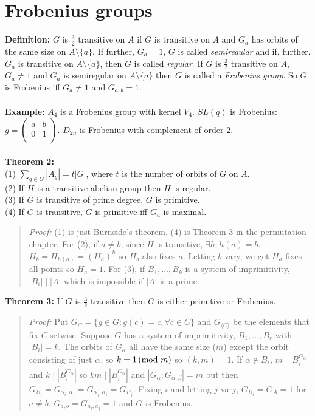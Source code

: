 \section {Frobenius groups}
{\bf Definition:}  
$G$ is ${\frac 3 2}$ transitive on $A$ if $G$ is transitive on $A$ and $G_a$ has orbits of
the same size on $A \setminus \{a\}$. 
If further, $G_a = 1$, $G$ is called \emph{semiregular} and if, further, $G_a$ is transitive on $A \setminus \{a\}$,
then $G$ is called \emph{regular}.  If $G$ is ${\frac 3 2}$ transitive on $A$, $G_a \ne 1$ and $G_a$ is
semiregular on $A \setminus \{a\}$ then $G$ is called a \emph{Frobenius group}.  So $G$ is Frobenius iff
$G_a \ne 1$ and $G_{a,b} = 1$.
\\
\\
{\bf Example:} $A_4$ is a Frobenius group with kernel $V_4$. $SL(q)$ is Frobenius:
$g = 
\left(
\begin{array}{cc}
a &  b \\
0 &  1 \\
\end{array}
\right)$.
$D_{2n}$ is Frobenius with complement of order $2$.
\\
\\
{\bf Theorem 2:} \\
(1) $\sum_{g \in G} |A_g| = t |G|$, where $t$  is the number of orbits of $G$ on $A$.
\\
(2) If $H$ is a transitive abelian group then $H$ is regular.
\\
(3) If $G$ is transitive of prime degree, $G$ is primitive.
\\
(4) If $G$ is transitive, $G$ is primitive iff $G_a$ is maximal.
\begin{quote}
\emph{Proof:}
(1) is just Burnside's theorem. (4) is Theorem 3 in the permutation chapter.
For (2), if $a \ne b$, since $H$ is transitive, $\exists h: h(a) = b$.
$H_b = H_{h(a)} = (H_a)^h$ so $H_b$ also fixes $a$.  Letting $b$ vary, we get $H_a$ fixes all points so
$H_a = 1$.  For (3), if $B_1, \ldots, B_k$ is a system of imprimitivity, $|B_i| \mid |A|$ which is impossible if
$|A|$ is a prime.
\end{quote}
{\bf Theorem 3:} If $G$ is ${\frac 3 2}$ transitive then $G$ is either primitive or Frobenius.
\begin{quote}
\emph{Proof:}
Put $G_C = \{ g \in G: g(c)=c, \forall c \in C \}$ and $G_{\langle C \rangle}$ be the elements that fix $C$ setwise.
Suppose $G$ has a system of imprimitivity, $B_1, \ldots, B_r$ with $|B_i|=k$.  The orbits of $G_{\alpha}$ all have the same size
($m$) except the orbit consisting of just $\alpha$, so $k = 1 \thinspace \textnormal{(mod } m \textnormal{)}$ so $(k,m)=1$.  If $\alpha \notin B_i$,
$m \mid |B_i^{G_{\alpha}}|$ and $k \mid |B_i^{G_{\alpha}}|$ so $km \mid |B_i^{G_{\alpha}}|$ and $|G_{\alpha} : G_{\alpha, \beta}| = m$
but then $G_{B_i} = G_{\alpha_i, \alpha_j} = G_{\alpha_j, \alpha_i} = G_{B_j}$.  Fixing $i$ and letting $j$ vary, $G_{B_i}= G_A = 1$
for $a \ne b$.  $G_{a,b} = G_{a_i, a_j} = 1$ and $G$ is Frobenius.
\end{quote}
